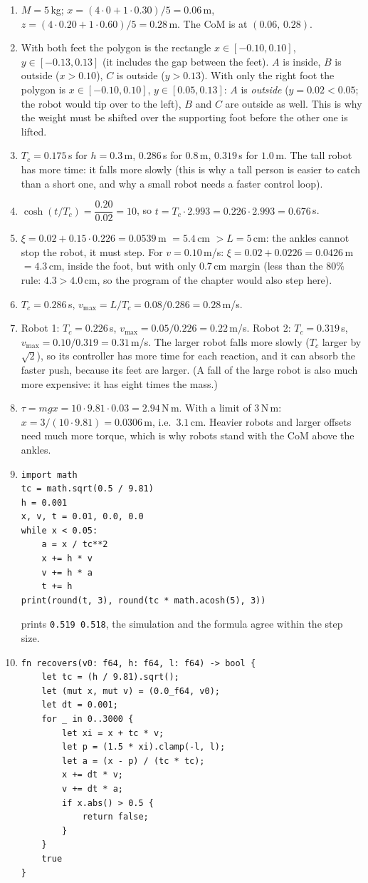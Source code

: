 \begin{enumerate}[label=\textbf{\ansnum.\arabic*}]
  \item $M=5$\,kg; $x=(4\cdot0+1\cdot0.30)/5=0.06$\,m, $z=(4\cdot0.20+1\cdot0.60)/5=0.28$\,m. The CoM is at $(0.06,\,0.28)$.
  \item With both feet the polygon is the rectangle $x\in[-0.10,0.10]$, $y\in[-0.13,0.13]$ (it includes the gap between the feet). $A$ is inside, $B$ is outside ($x>0.10$), $C$ is outside ($y>0.13$). With only the right foot the polygon is $x\in[-0.10,0.10]$, $y\in[0.05,0.13]$: $A$ is \emph{outside} ($y=0.02<0.05$; the robot would tip over to the left), $B$ and $C$ are outside as well. This is why the weight must be shifted over the supporting foot before the other one is lifted.
  \item $T_c=0.175$\,s for $h=0.3$\,m, $0.286$\,s for $0.8$\,m, $0.319$\,s for $1.0$\,m. The tall robot has more time: it falls more slowly (this is why a tall person is easier to catch than a short one, and why a small robot needs a faster control loop).
  \item $\cosh(t/T_c)=\dfrac{0.20}{0.02}=10$, so $t=T_c\cdot2.993=0.226\cdot2.993=0.676$\,s.
  \item $\xi=0.02+0.15\cdot0.226=0.0539$\,m $=5.4$\,cm $>L=5$\,cm: the ankles cannot stop the robot, it must step. For $v=0.10$\,m/s: $\xi=0.02+0.0226=0.0426$\,m $=4.3$\,cm, inside the foot, but with only $0.7$\,cm margin (less than the $80\%$ rule: $4.3>4.0$\,cm, so the program of the chapter would also step here).
  \item $T_c=0.286$\,s, $v_{\max}=L/T_c=0.08/0.286=0.28$\,m/s.
  \item Robot 1: $T_c=0.226$\,s, $v_{\max}=0.05/0.226=0.22$\,m/s. Robot 2: $T_c=0.319$\,s, $v_{\max}=0.10/0.319=0.31$\,m/s. The larger robot falls more slowly ($T_c$ larger by $\sqrt2$), so its controller has more time for each reaction, and it can absorb the faster push, because its feet are larger. (A fall of the large robot is also much more expensive: it has eight times the mass.)
  \item $\tau=mgx=10\cdot9.81\cdot0.03=2.94$\,N\,m. With a limit of $3$\,N\,m: $x=3/(10\cdot9.81)=0.0306$\,m, i.e.\ $3.1$\,cm. Heavier robots and larger offsets need much more torque, which is why robots stand with the CoM above the ankles.
  \item
\begin{verbatim}
import math
tc = math.sqrt(0.5 / 9.81)
h = 0.001
x, v, t = 0.01, 0.0, 0.0
while x < 0.05:
    a = x / tc**2
    x += h * v
    v += h * a
    t += h
print(round(t, 3), round(tc * math.acosh(5), 3))
\end{verbatim}
prints \verb!0.519 0.518!, the simulation and the formula agree within the step size.
  \item
\begin{verbatim}
fn recovers(v0: f64, h: f64, l: f64) -> bool {
    let tc = (h / 9.81).sqrt();
    let (mut x, mut v) = (0.0_f64, v0);
    let dt = 0.001;
    for _ in 0..3000 {
        let xi = x + tc * v;
        let p = (1.5 * xi).clamp(-l, l);
        let a = (x - p) / (tc * tc);
        x += dt * v;
        v += dt * a;
        if x.abs() > 0.5 {
            return false;
        }
    }
    true
}


\end{verbatim}
\end{enumerate}
